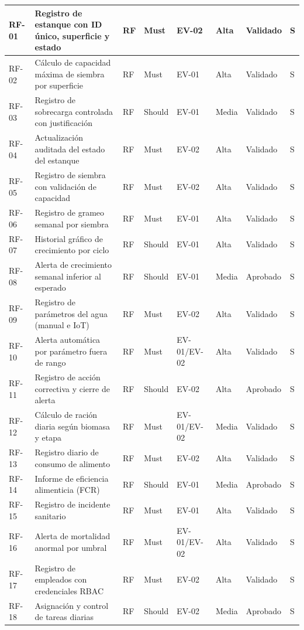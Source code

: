 \documentclass[11pt,a4paper]{article}
\renewcommand{\_}{\textunderscore\allowbreak}
\begin{document}
\begin{landscape}
\begin{longtable}{|p{1.3cm}|p{6.0cm}|p{1.1cm}|p{1.9cm}|p{2.3cm}|p{2.2cm}|p{1.9cm}|p{1.7cm}|}
RF-01 & Registro de estanque con ID único, superficie y estado & RF & Must & EV-02 & Alta & Validado & S\\
\hline
RF-02 & Cálculo de capacidad máxima de siembra por superficie & RF & Must & EV-01 & Alta & Validado & S\\
\hline
RF-03 & Registro de sobrecarga controlada con justificación & RF & Should & EV-01 & Media & Validado & S\\
\hline
RF-04 & Actualización auditada del estado del estanque & RF & Must & EV-02 & Alta & Validado & S\\
\hline
RF-05 & Registro de siembra con validación de capacidad & RF & Must & EV-02 & Alta & Validado & S\\
\hline
RF-06 & Registro de grameo semanal por siembra & RF & Must & EV-01 & Alta & Validado & S\\
\hline
RF-07 & Historial gráfico de crecimiento por ciclo & RF & Should & EV-01 & Alta & Validado & S\\
\hline
RF-08 & Alerta de crecimiento semanal inferior al esperado & RF & Should & EV-01 & Media & Aprobado & S\\
\hline
RF-09 & Registro de parámetros del agua (manual e IoT) & RF & Must & EV-02 & Alta & Validado & S\\
\hline
RF-10 & Alerta automática por parámetro fuera de rango & RF & Must & EV-01/EV-02 & Alta & Validado & S\\
\hline
RF-11 & Registro de acción correctiva y cierre de alerta & RF & Should & EV-02 & Alta & Aprobado & S\\
\hline
RF-12 & Cálculo de ración diaria según biomasa y etapa & RF & Must & EV-01/EV-02 & Media & Validado & S\\
\hline
RF-13 & Registro diario de consumo de alimento & RF & Must & EV-02 & Alta & Validado & S\\
\hline
RF-14 & Informe de eficiencia alimenticia (FCR) & RF & Should & EV-01 & Media & Aprobado & S\\
\hline
RF-15 & Registro de incidente sanitario & RF & Must & EV-01 & Alta & Validado & S\\
\hline
RF-16 & Alerta de mortalidad anormal por umbral & RF & Must & EV-01/EV-02 & Alta & Validado & S\\
\hline
RF-17 & Registro de empleados con credenciales RBAC & RF & Must & EV-02 & Alta & Validado & S\\
\hline
RF-18 & Asignación y control de tareas diarias & RF & Should & EV-02 & Media & Aprobado & S\\

\end{longtable}
\end{landscape}
\end{document}
